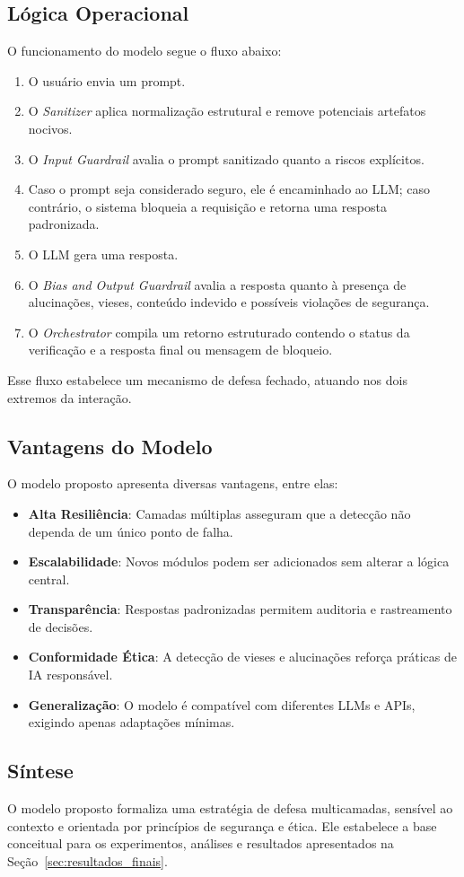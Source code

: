 \subsection{Lógica Operacional}

O funcionamento do modelo segue o fluxo abaixo:

\begin{enumerate}
    \item O usuário envia um prompt.
    \item O \textit{Sanitizer} aplica normalização estrutural e remove potenciais artefatos nocivos.
    \item O \textit{Input Guardrail} avalia o prompt sanitizado quanto a riscos explícitos.
    \item Caso o prompt seja considerado seguro, ele é encaminhado ao LLM; caso contrário, o sistema bloqueia a requisição e retorna uma resposta padronizada.
    \item O LLM gera uma resposta.
    \item O \textit{Bias and Output Guardrail} avalia a resposta quanto à presença de alucinações, vieses, conteúdo indevido e possíveis violações de segurança.
    \item O \textit{Orchestrator} compila um retorno estruturado contendo o status da verificação e a resposta final ou mensagem de bloqueio.
\end{enumerate}

Esse fluxo estabelece um mecanismo de defesa fechado, atuando nos dois extremos da interação.

\subsection{Vantagens do Modelo}

O modelo proposto apresenta diversas vantagens, entre elas:

\begin{itemize}
    \item \textbf{Alta Resiliência}: Camadas múltiplas asseguram que a detecção não dependa de um único ponto de falha.
    \item \textbf{Escalabilidade}: Novos módulos podem ser adicionados sem alterar a lógica central.
    \item \textbf{Transparência}: Respostas padronizadas permitem auditoria e rastreamento de decisões.
    \item \textbf{Conformidade Ética}: A detecção de vieses e alucinações reforça práticas de IA responsável.
    \item \textbf{Generalização}: O modelo é compatível com diferentes LLMs e APIs, exigindo apenas adaptações mínimas.
\end{itemize}

\subsection{Síntese}

O modelo proposto formaliza uma estratégia de defesa multicamadas, sensível ao contexto e orientada por princípios de segurança e ética. Ele estabelece a base conceitual para os experimentos, análises e resultados apresentados na Seção~\ref{sec:resultados_finais}.

